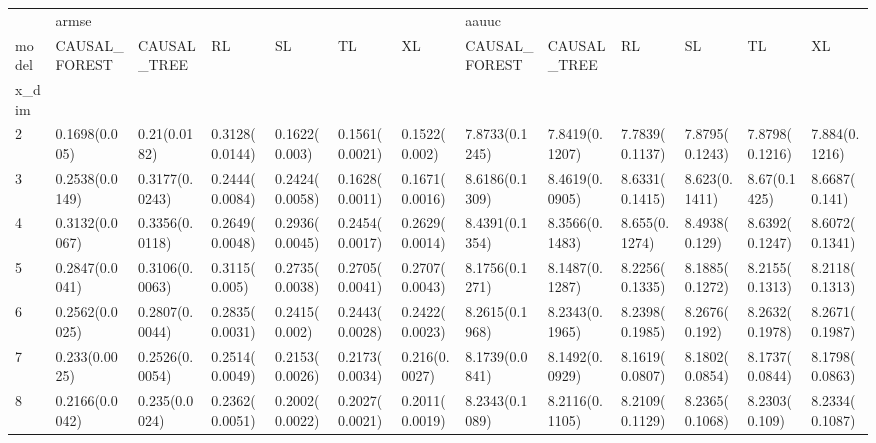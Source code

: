 \begin{tabular}{lllllllllllll}
\toprule
{} & \multicolumn{6}{l}{armse} & \multicolumn{6}{l}{aauuc} \\
model &   CAUSAL\_FOREST &     CAUSAL\_TREE &              RL &              SL &              TL &              XL &   CAUSAL\_FOREST &     CAUSAL\_TREE &              RL &              SL &              TL &              XL \\
x\_dim &                 &                 &                 &                 &                 &                 &                 &                 &                 &                 &                 &                 \\
\midrule
2     &   0.1698(0.005) &    0.21(0.0182) &  0.3128(0.0144) &   0.1622(0.003) &  0.1561(0.0021) &   0.1522(0.002) &  7.8733(0.1245) &  7.8419(0.1207) &  7.7839(0.1137) &  7.8795(0.1243) &  7.8798(0.1216) &   7.884(0.1216) \\
3     &  0.2538(0.0149) &  0.3177(0.0243) &  0.2444(0.0084) &  0.2424(0.0058) &  0.1628(0.0011) &  0.1671(0.0016) &  8.6186(0.1309) &  8.4619(0.0905) &  8.6331(0.1415) &   8.623(0.1411) &    8.67(0.1425) &   8.6687(0.141) \\
4     &  0.3132(0.0067) &  0.3356(0.0118) &  0.2649(0.0048) &  0.2936(0.0045) &  0.2454(0.0017) &  0.2629(0.0014) &  8.4391(0.1354) &  8.3566(0.1483) &   8.655(0.1274) &   8.4938(0.129) &  8.6392(0.1247) &  8.6072(0.1341) \\
5     &  0.2847(0.0041) &  0.3106(0.0063) &   0.3115(0.005) &  0.2735(0.0038) &  0.2705(0.0041) &  0.2707(0.0043) &  8.1756(0.1271) &  8.1487(0.1287) &  8.2256(0.1335) &  8.1885(0.1272) &  8.2155(0.1313) &  8.2118(0.1313) \\
6     &  0.2562(0.0025) &  0.2807(0.0044) &  0.2835(0.0031) &   0.2415(0.002) &  0.2443(0.0028) &  0.2422(0.0023) &  8.2615(0.1968) &  8.2343(0.1965) &  8.2398(0.1985) &   8.2676(0.192) &  8.2632(0.1978) &  8.2671(0.1987) \\
7     &   0.233(0.0025) &  0.2526(0.0054) &  0.2514(0.0049) &  0.2153(0.0026) &  0.2173(0.0034) &   0.216(0.0027) &  8.1739(0.0841) &  8.1492(0.0929) &  8.1619(0.0807) &  8.1802(0.0854) &  8.1737(0.0844) &  8.1798(0.0863) \\
8     &  0.2166(0.0042) &   0.235(0.0024) &  0.2362(0.0051) &  0.2002(0.0022) &  0.2027(0.0021) &  0.2011(0.0019) &  8.2343(0.1089) &  8.2116(0.1105) &  8.2109(0.1129) &  8.2365(0.1068) &   8.2303(0.109) &  8.2334(0.1087) \\
\bottomrule
\end{tabular}
